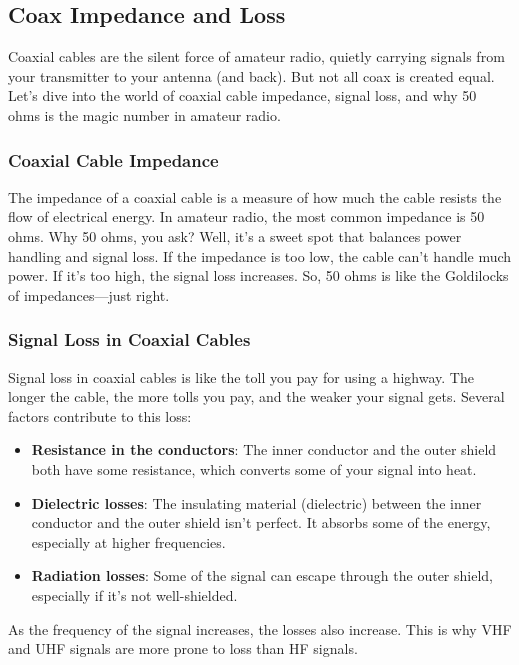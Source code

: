 \subsection{Coax Impedance and Loss}
\label{subsec:coax-imp}

Coaxial cables are the silent force of amateur radio, quietly carrying signals from your transmitter to your antenna (and back). But not all coax is created equal. Let's dive into the world of coaxial cable impedance, signal loss, and why 50 ohms is the magic number in amateur radio.

\subsubsection*{Coaxial Cable Impedance}
The impedance of a coaxial cable is a measure of how much the cable resists the flow of electrical energy. In amateur radio, the most common impedance is 50 ohms. Why 50 ohms, you ask? Well, it's a sweet spot that balances power handling and signal loss. If the impedance is too low, the cable can't handle much power. If it's too high, the signal loss increases. So, 50 ohms is like the Goldilocks of impedances—just right.

\subsubsection*{Signal Loss in Coaxial Cables}
Signal loss in coaxial cables is like the toll you pay for using a highway. The longer the cable, the more tolls you pay, and the weaker your signal gets. Several factors contribute to this loss:
\begin{itemize}[noitemsep]    \item \textbf{Resistance in the conductors}: The inner conductor and the outer shield both have some resistance, which converts some of your signal into heat.
    \item \textbf{Dielectric losses}: The insulating material (dielectric) between the inner conductor and the outer shield isn't perfect. It absorbs some of the energy, especially at higher frequencies.
    \item \textbf{Radiation losses}: Some of the signal can escape through the outer shield, especially if it's not well-shielded.
\end{itemize}

As the frequency of the signal increases, the losses also increase. This is why VHF and UHF signals are more prone to loss than HF signals.

